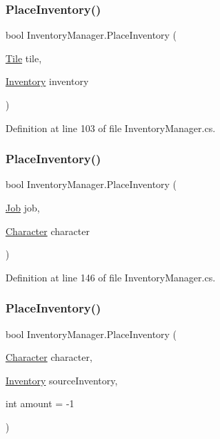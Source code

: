 \subsubsection{\texorpdfstring{Place\+Inventory()}{PlaceInventory()}\hspace{0.1cm}{\footnotesize\ttfamily [1/3]}}
{\footnotesize\ttfamily bool Inventory\+Manager.\+Place\+Inventory (\begin{DoxyParamCaption}\item[{\hyperlink{class_tile}{Tile}}]{tile,  }\item[{\hyperlink{class_inventory}{Inventory}}]{inventory }\end{DoxyParamCaption})}



Definition at line 103 of file Inventory\+Manager.\+cs.

\mbox{\label{class_inventory_manager_ab856572ce77ff10df2023df85e70a903}} 
\subsubsection{\texorpdfstring{Place\+Inventory()}{PlaceInventory()}\hspace{0.1cm}{\footnotesize\ttfamily [2/3]}}
{\footnotesize\ttfamily bool Inventory\+Manager.\+Place\+Inventory (\begin{DoxyParamCaption}\item[{\hyperlink{class_job}{Job}}]{job,  }\item[{\hyperlink{class_project_porcupine_1_1_entities_1_1_character}{Character}}]{character }\end{DoxyParamCaption})}



Definition at line 146 of file Inventory\+Manager.\+cs.

\mbox{\label{class_inventory_manager_a03c111fd95443a2874da2a82b68d89bc}} 
\subsubsection{\texorpdfstring{Place\+Inventory()}{PlaceInventory()}\hspace{0.1cm}{\footnotesize\ttfamily [3/3]}}
{\footnotesize\ttfamily bool Inventory\+Manager.\+Place\+Inventory (\begin{DoxyParamCaption}\item[{\hyperlink{class_project_porcupine_1_1_entities_1_1_character}{Character}}]{character,  }\item[{\hyperlink{class_inventory}{Inventory}}]{source\+Inventory,  }\item[{int}]{amount = {\ttfamily -\/1} }\end{DoxyParamCaption})}



